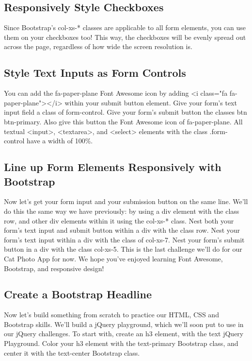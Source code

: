 \documentclass{article}%
\begin{document}
%
\subsection{Responsively Style Checkboxes}%
\label{subsec:ResponsivelyStyleCheckboxes}%
  Since Bootstrap's col{-}xs{-}* classes are applicable to all form elements, you can use them on your checkboxes too! This way, the checkboxes will be evenly spread out across the page, regardless of how wide the screen resolution is.\newline%

%
\subsection{Style Text Inputs as Form Controls}%
\label{subsec:StyleTextInputsasFormControls}%
You can add the fa{-}paper{-}plane Font Awesome icon by adding <i class="fa fa{-}paper{-}plane"></i> within your submit button element.\newline%
Give your form's text input field a class of form{-}control. Give your form's submit button the classes btn btn{-}primary. Also give this button the Font Awesome icon of fa{-}paper{-}plane.\newline%
All textual <input>, <textarea>, and <select> elements with the class .form{-}control have a width of 100\%.\newline%

%
\subsection{Line up Form Elements Responsively with Bootstrap}%
\label{subsec:LineupFormElementsResponsivelywithBootstrap}%
Now let's get your form input and your submission button on the same line. We'll do this the same way we have previously: by using a div element with the class row, and other div elements within it using the col{-}xs{-}* class.\newline%
Nest both your form's text input and submit button within a div with the class row. Nest your form's text input within a div with the class of col{-}xs{-}7. Nest your form's submit button in a div with the class col{-}xs{-}5.\newline%
This is the last challenge we'll do for our Cat Photo App for now. We hope you've enjoyed learning Font Awesome, Bootstrap, and responsive design!\newline%

%
\subsection{Create a Bootstrap Headline}%
\label{subsec:CreateaBootstrapHeadline}%
Now let's build something from scratch to practice our HTML, CSS and Bootstrap skills.\newline%
We'll build a jQuery playground, which we'll soon put to use in our jQuery challenges.\newline%
To start with, create an h3 element, with the text jQuery Playground.\newline%
Color your h3 element with the text{-}primary Bootstrap class, and center it with the text{-}center Bootstrap class.\newline%
\end{document}
